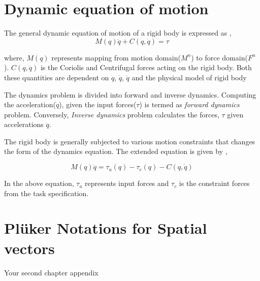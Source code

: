 \chapter{Dynamic equation of motion}\label{chap:dynamic}
The general dynamic equation of motion of a rigid body is expressed as \cite{featherstone2014rigid} \cite{shakhimardanov2015composable}, 
\begin{equation}
	\label{eq:dynamic}
	M(q)\ddot{q} + C(q, \dot{q}) = \tau 
\end{equation}

where, $M(q)$ represents mapping from motion domain($M^n$) to force domain($F^n$). $C(q, \dot{q})$ is the Coriolis and Centrifugal forces acting on the rigid body. Both these quantities are dependent on $q$, $\dot{q}$, $\ddot{q}$ and the physical model of rigid body \cite{featherstone2014rigid}

The dynamics problem is divided into forward and inverse dynamics. Computing the acceleration($\ddot{q}$), given the input forces($\tau$) is termed as \textit{forward dynamics} problem. Conversely, \textit{Inverse dynamics} problem calculates the forces, $\tau$ given accelerations $\ddot{q}$.

The rigid body is generally subjected to various motion constraints that changes the form of the dynamics equation. The extended equation is given by \cite{shakhimardanov2015composable},

\begin{equation}
\label{eq:extendeddynamic}
M(q)\ddot{q} = \tau_a(q) - \tau_c(q) -  C(q, \dot{q})
\end{equation}

In the above equation, $\tau_a$ represents input forces and $\tau_c$ is the constraint forces from the task specification.

\chapter{Pl{\"u}ker Notations for Spatial vectors}\label{chap:plucker}
Your second chapter appendix
